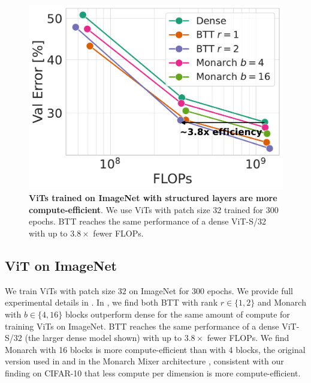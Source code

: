 \documentclass{article}
\theoremstyle{plain}
\theoremstyle{definition}
\theoremstyle{remark}
\begin{document}
\begin{figure}[!t]
\centering
    \includegraphics[width=0.8\linewidth]{figs/imagenet_val.pdf}
   \caption{
   \textbf{ViTs trained on ImageNet with structured layers are more compute-efficient}. We use ViTs with patch size 32 trained for 300 epochs. BTT reaches the same performance of a dense ViT-S/32 with up to $3.8\times$ fewer FLOPs. 
   }
    \label{fig:imagenet}
\end{figure}

\subsection{ViT on ImageNet}
%
%
We train ViTs with patch size $32$ on ImageNet for 300 epochs. We provide full experimental details in .
In , we find both BTT with rank $r \in \{1, 2\}$ and Monarch with $b \in \{4, 16\}$ blocks outperform dense for the same amount of compute for training ViTs on ImageNet. BTT reaches the same performance of a dense ViT-S/32 (the larger dense model shown) with up to $3.8\times$ fewer FLOPs. We find Monarch with 16 blocks is more compute-efficient than with 4 blocks, the original version used in \citet{dao2022monarch} and in the Monarch Mixer architecture \citep{fu2023mixer}, consistent with our finding on CIFAR-10 that less compute per dimension is more compute-efficient.
\end{document}
